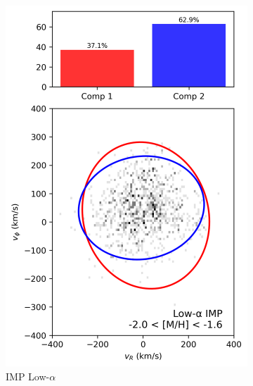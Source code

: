 \documentclass[a4paper,10pt]{article}
\begin{document}
\begin{multicols}{2}
\begin{figure}[H]
\begin{subfigure}[t]{0.24\linewidth}
    \includegraphics[width=\linewidth]{../figures/gmm_imp_low_alpha_k2.png}
    \caption{IMP Low-$\alpha$}
  \end{subfigure}
  \hfill
  \begin{subfigure}[t]{0.24\linewidth}

\end{subfigure}
\end{figure}
\end{multicols}
\end{document}
